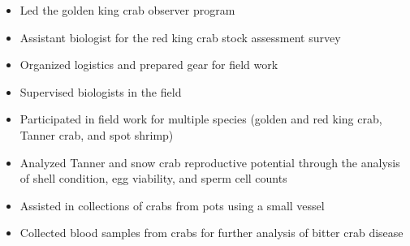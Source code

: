 \documentclass[10pt,a4paper,ragged2e]{altacv}
\begin{document}
\begin{fullwidth}
\begin{itemize}
\item Led the golden king crab observer program
\item Assistant biologist for the red king crab stock assessment survey
\item Organized logistics and prepared gear for field work
\item Supervised biologists in the field
\item Participated in field work for multiple species (golden and red king crab, Tanner crab, and spot shrimp)
\smallskip
\end{itemize}
\vspace{0.15cm}
\begin{itemize}
\item Analyzed Tanner and snow crab reproductive potential through the analysis of shell condition, egg viability, and sperm cell counts
\item Assisted in collections of crabs from pots using a small vessel
\item Collected blood samples from crabs for further analysis of bitter crab disease
\end{itemize}
\end{fullwidth}

\vspace{0.30cm}






\end{document}
